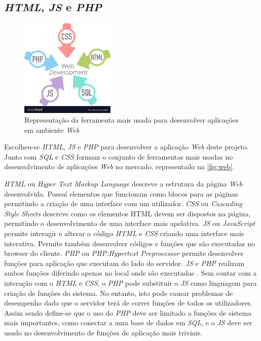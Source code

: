\documentclass[11pt,twoside,a4paper]{report}
\begin{document}
\subsection{\textit{HTML}, \textit{JS} e \textit{PHP}}
\begin{figure}[H]
	\begin{center}
		\includegraphics[trim={0 2.85cm 0 0},clip,width=0.4\textwidth]{web} %
		\caption[Representaçoã da ferramenta mais usada para desenvolver aplicações \textit{Web}]{Representação da ferramenta mais usada para desenvolver aplicações em ambiente \textit{Web} \cite{web_logo}}
		\label{fig:web}
	\end{center}
\end{figure}
Escolheu-se \textit{HTML}, \textit{JS} e \textit{PHP} para desenvolver a aplicação \textit{Web} deste projeto. Junto com \textit{SQL} e \textit{CSS} formam o conjunto de ferramentas mais usadas no desenvolvimento de aplicações \textit{Web} no mercado, representado na \autoref{fig:web}.\par 
\textit{HTML} ou \textit{Hyper Text Markup Language} descreve a estrutura da página \textit{Web} desenvolvida. Possuí elementos que funcionam como blocos para as páginas permitindo a criação de uma interface com um utilizador. \textit{CSS} ou \textit{Cascading Style Sheets} descreve como os elementos HTML devem ser dispostos na página, permitindo o desenvolvimento de uma interface mais apelativa. \textit{JS} ou \textit{JavaScript} permite interagir e alterar o código \textit{HTML} e \textit{CSS} criando uma interface mais interativa. Permite também desenvolver códigos e funções que são executadas no browser do cliente. \textit{PHP} ou \textit{PHP:Hypertext Preprocessor} permite desenvolver funções para aplicação que executam do lado do servidor. \textit{JS} e \textit{PHP} realizam ambos funções diferindo apenas no local onde são executadas \cite{web}. Sem contar com a interação com o \textit{HTML} e \textit{CSS}, o \textit{PHP} pode substituir o \textit{JS} como linguagem para criação de funções do sistema. No entanto, isto pode causar problemas de desempenho dado que o servidor terá de correr funções de todos os utilizadores. Assim sendo define-se que o uso do \textit{PHP} deve ser limitado a funções de sistema mais importantes, como conectar a uma base de dados em \textit{SQL}, e o \textit{JS} deve ser usado no desenvolvimento de funções de aplicação mais triviais.
\end{document}

